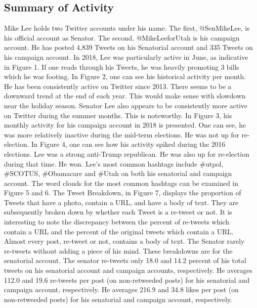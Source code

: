 \documentclass{article}
\begin{document}
\subsection{Summary of Activity}
\begin{flushleft} Mike Lee holds two Twitter accounts under his name. The first, @SenMikeLee, is his official account as Senator. The second, @MikeLeeforUtah is his campaign account. He has posted 4,839 Tweets on his Senatorial account and 335 Tweets on his campaign account. In 2018, Lee was particularly active in June, as indicative in Figure 1. If one reads through his Tweets, he was heavily promoting 3 bills which he was footing. In Figure 2, one can see his historical activity per month. He has been consistently active on Twitter since 2013. There seems to be a downward trend at the end of each year. This would make sense with slowdown near the holiday season. Senator Lee also appears to be consistently more active on Twitter during the summer months. This is noteworthy. In Figure 3, his monthly activity for his campaign account in 2018 is presented. One can see, he was more relatively inactive during the mid-term elections. He was not up for re-election. In Figure 4, one can see how his activity spiked during the 2016 elections. Lee was a strong anti-Trump republican. He was also up for re-election during that time. He won. Lee's most common hashtags include \#utpol, \#SCOTUS, \#Obamacare and \#Utah on both his senatorial and campaign account. The word clouds for the most common hashtags can be examined in Figure 5 and 6. The Tweet Breakdown, in Figure 7, displays the proportion of Tweets that have a photo, contain a URL, and have a body of text. They are subsequently broken down by whether each Tweet is a re-tweet or not. It is interesting to note the discrepancy between the percent of re-tweets which contain a URL and the percent of the original tweets which contain a URL. Almost every post, re-tweet or not, contains a body of text. The Senator rarely re-tweets without adding a piece of his mind. These breakdowns are for the senatorial account. The senator re-tweets only 18.0 and 14.2 percent of his total tweets on his senatorial account and campaign accounts, respectively. He averages 112.0 and 19.6 re-tweets per post (on non-retweeded posts) for his senatorial and campaign account, respectively. He averages 216.9 and 34.8 likes per post (on non-retweeded posts) for his senatorial and campaign account, respectively. 
\end{flushleft}
\end{document}
